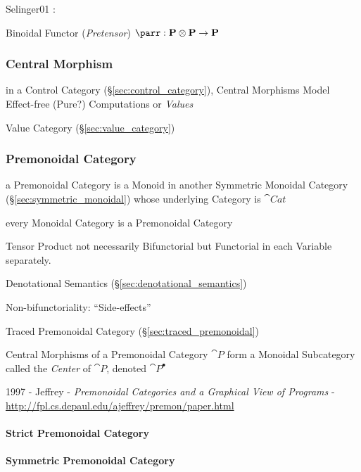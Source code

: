 Selinger01 \cite{selinger01}:

Binoidal Functor (\emph{Pretensor}) $\parr : \cat{P} \otimes \cat{P}
\rightarrow \cat{P}$



\subsubsection{Central Morphism}\label{sec:central_morphism}

in a Control Category (\S\ref{sec:control_category}), Central
Morphisms Model Effect-free (Pure?) Computations or \emph{Values}

Value Category (\S\ref{sec:value_category})



\subsubsection{Premonoidal Category}\label{sec:premonoidal_category}

a Premonoidal Category is a Monoid in another Symmetric Monoidal Category
(\S\ref{sec:symmetric_monoidal}) whose underlying Category is $\cat{Cat}$

every Monoidal Category is a Premonoidal Category

Tensor Product not necessarily Bifunctorial but Functorial in each Variable
separately.

Denotational Semantics (\S\ref{sec:denotational_semantics})

Non-bifunctoriality: ``Side-effects'' \cite{jacobs-heunen-hasuo09}

Traced Premonoidal Category (\S\ref{sec:traced_premonoidal})

Central Morphisms of a Premonoidal Category $\cat{P}$ form a Monoidal
Subcategory called the \emph{Center} of $\cat{P}$, denoted $\cat{P}^\bullet$

1997 - Jeffrey - \emph{Premonoidal Categories and a Graphical View of Programs}
- \url{http://fpl.cs.depaul.edu/ajeffrey/premon/paper.html}



\paragraph{Strict Premonoidal Category}\label{sec:strict_premonoidal}
\hfill

\paragraph{Symmetric Premonoidal Category}
\label{sec:symmetric_premonoidal} \hfill

